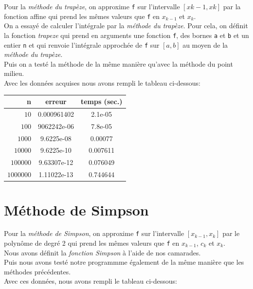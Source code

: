 \documentclass{article}
\begin{document}
	Pour la\textit{ méthode du trapèze}, on approxime \texttt{f} sur l'intervalle $[x{k-1},x{k}]$ par la fonction affine qui prend les mêmes valeurs que \texttt{f} en $x_{k-1}$ et $x_k$.\\

	On a essayé de calculer l'intégrale par la \textit{méthode du trapèze}. Pour cela, on définit la fonction \textit{trapeze} qui prend en arguments une fonction \texttt{f}, des bornes \texttt{a} et \texttt{b} et un entier \texttt{n} et qui renvoie l'intégrale approchée de \texttt{f} sur $[a,b]$ au moyen de la \textit{méthode du trapèze}.\\

	Puis on a testé la méthode de la même manière qu'avec la méthode du point milieu. \\ 

Avec les données acquises nous avons rempli le tableau ci-dessous:
\\

\begin{center}
\begin{tabular}{r | c | c}
{n} & erreur & temps (sec.)\\
\hline
$10$ & {0.000961402} & {2.1e-05}\\
$100$ & {9062242e-06} & {7.8e-05}\\
$1000$ & {9.6225e-08} & {0.00077}\\
$10000$ & {9.6225e-10} & {0.007611}\\
$100000$ & {9.63307e-12} & {0.076049}\\
$1000000$ & {1.11022e-13} & {0.744644}
\end{tabular}
\end{center}

\section{Méthode de Simpson}

Pour la \textit{méthode de Simpson}, on approxime \texttt{f} sur l'intervalle $[x_{k-1}, x_k]$ par le polynôme de degré 2 qui prend les mêmes valeurs que \texttt{f} en $x_{k-1}$, $c_k$ et $x_k$.\\
Nous avons définit la \textit{fonction Simpson} à l'aide de nos camarades.\\ 

	Puis nous avons testé notre programmme également de la même manière que les méthodes précédentes.\\ 
	Avec ces données, nous avons rempli le tableau ci-dessous: \\
\end{document}
